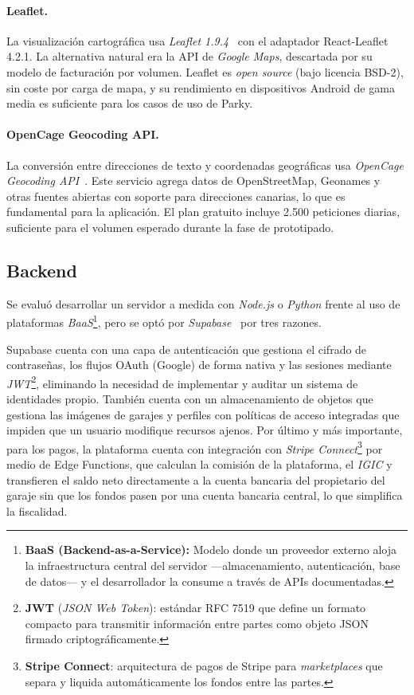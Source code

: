 \paragraph{Leaflet.}
La visualización cartográfica usa \textit{Leaflet 1.9.4}~\cite{leafletjs2024} con el adaptador React-Leaflet 4.2.1. La alternativa natural era la API de \textit{Google Maps}, descartada por su modelo de facturación por volumen. Leaflet es \textit{open source} (bajo licencia BSD-2), sin coste por carga de mapa, y su rendimiento en dispositivos Android de gama media es suficiente para los casos de uso de Parky.

\paragraph{OpenCage Geocoding API.}
La conversión entre direcciones de texto y coordenadas geográficas usa \textit{OpenCage Geocoding API}~\cite{opencage2024}. Este servicio agrega datos de OpenStreetMap, Geonames y otras fuentes abiertas con soporte para direcciones canarias, lo que es fundamental para la aplicación. El plan gratuito incluye 2.500 peticiones diarias, suficiente para el volumen esperado durante la fase de prototipado.

\subsection{Backend}
\label{subsec:backend}

Se evaluó desarrollar un servidor a medida con \textit{Node.js} o \textit{Python} frente al uso de plataformas \textit{BaaS}\footnote{\textbf{BaaS (Backend-as-a-Service):} Modelo donde un proveedor externo aloja la infraestructura central del servidor —almacenamiento, autenticación, base de datos— y el desarrollador la consume a través de APIs documentadas.}, pero se optó por \textit{Supabase}~\cite{supabase2024} por tres razones.

Supabase cuenta con una capa de autenticación que gestiona el cifrado de contraseñas, los flujos OAuth (Google) de forma nativa y las sesiones mediante \textit{JWT}\footnote{\textbf{JWT} (\textit{JSON Web Token}): estándar RFC 7519 que define un formato compacto para transmitir información entre partes como objeto JSON firmado criptográficamente.}, eliminando la necesidad de implementar y auditar un sistema de identidades propio. También cuenta con un almacenamiento de objetos que gestiona las imágenes de garajes y perfiles con políticas de acceso integradas que impiden que un usuario modifique recursos ajenos. Por último y más importante, para los pagos, la plataforma cuenta con integración con \textit{Stripe Connect}\footnote{\textbf{Stripe Connect}: arquitectura de pagos de Stripe para \textit{marketplaces} que separa y liquida automáticamente los fondos entre las partes.} por medio de Edge Functions, que calculan la comisión de la plataforma, el \textit{IGIC} y transfieren el saldo neto directamente a la cuenta bancaria del propietario del garaje sin que los fondos pasen por una cuenta bancaria central, lo que simplifica la fiscalidad.


